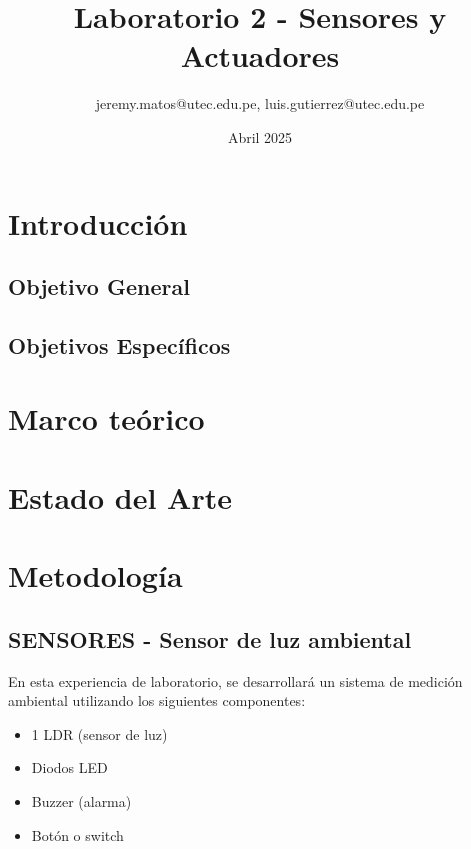 \documentclass{article}
\title{Laboratorio 2 - Sensores y Actuadores}
\author{jeremy.matos@utec.edu.pe, luis.gutierrez@utec.edu.pe}
\date{Abril 2025}
\begin{document}
\maketitle

\newpage
\tableofcontents
\newpage

\section{Introducción}

\subsection{Objetivo General}

\subsection{Objetivos Específicos}

\newpage

\section{Marco teórico}

\section{Estado del Arte}





\section{Metodología}

\subsection{SENSORES - Sensor de luz ambiental}


En esta experiencia de laboratorio, se desarrollará un sistema de medición ambiental utilizando los siguientes componentes: 
\begin{itemize}
    \item 1 LDR (sensor de luz)
    \item Diodos LED
    \item Buzzer (alarma)
    \item Botón o switch
\end{itemize}
\end{document}
